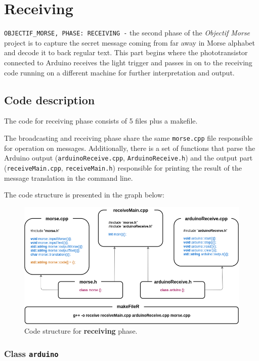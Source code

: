 \documentclass[12pt]{report}
\begin{document}
\newpage

\chapter{Receiving}

\verb|OBJECTIF_MORSE, PHASE: RECEIVING -| the second phase of the \textit{Objectif Morse} project is to capture the secret message coming from far away in Morse alphabet and decode it to back regular text. This part begins where the phototransistor connected to Arduino receives the light trigger and passes in on to the receiving code running on a different machine for further interpretation and output.

\section{Code description}

The code for receiving phase consists of 5 files plus a makefile. 

The broadcasting and receiving phase share the same \verb|morse.cpp| file responsible for operation on messages. Additionally, there is a set of functions that parse the Arduino output (\verb|arduinoReceive.cpp|, \verb|ArduinoReceive.h|) and the output part (\verb|receiveMain.cpp|, \verb|receiveMain.h|) responsible for printing the result of the message translation in the command line.

The code structure is presented in the graph below:

\begin{figure}[H]
\centering\includegraphics[width=15cm]{rCodeStructure}
\caption{Code structure for \textbf{receiving} phase.}	
\label{fig:re_code}
\end{figure}


\subsection{Class \texttt{arduino}}
\end{document}
